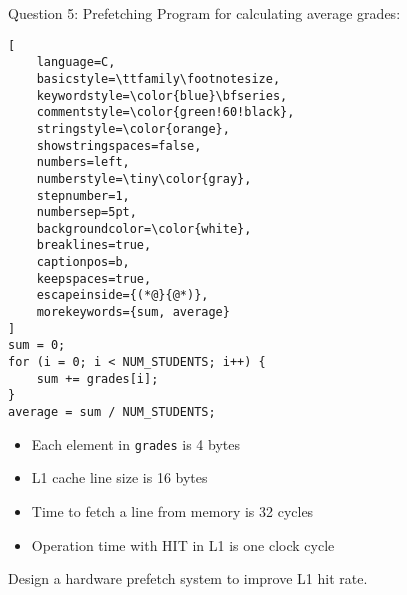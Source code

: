 \documentclass[aspectratio=169,12pt]{beamer}
\begin{document}
\begin{frame}[fragile]{Question 5: Prefetching}
Program for calculating average grades:

\vspace{0.3cm}
\begin{tcolorbox}[
    colback=gray!5,
    colframe=gray!50,
    boxrule=0.5pt,
    arc=2mm,
    left=2mm,
    right=2mm,
    top=1mm,
    bottom=1mm,
    fontupper=\small
]
\begin{lstlisting}[
    language=C,
    basicstyle=\ttfamily\footnotesize,
    keywordstyle=\color{blue}\bfseries,
    commentstyle=\color{green!60!black},
    stringstyle=\color{orange},
    showstringspaces=false,
    numbers=left,
    numberstyle=\tiny\color{gray},
    stepnumber=1,
    numbersep=5pt,
    backgroundcolor=\color{white},
    breaklines=true,
    captionpos=b,
    keepspaces=true,
    escapeinside={(*@}{@*)},
    morekeywords={sum, average}
]
sum = 0;
for (i = 0; i < NUM_STUDENTS; i++) {
    sum += grades[i];
}
average = sum / NUM_STUDENTS;
\end{lstlisting}
\end{tcolorbox}

\vspace{0.2cm}
\begin{itemize}
    \item Each element in \texttt{grades} is 4 bytes
    \item L1 cache line size is 16 bytes
    \item Time to fetch a line from memory is 32 cycles
    \item Operation time with HIT in L1 is one clock cycle
\end{itemize}

Design a hardware prefetch system to improve L1 hit rate.
\end{frame}
\end{document}
